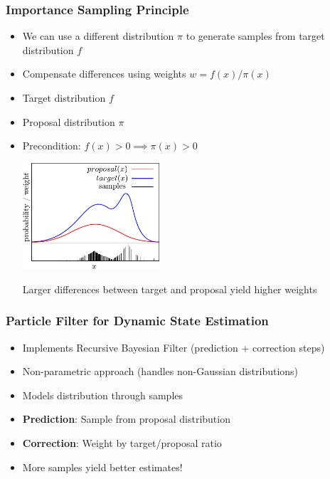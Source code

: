 \begin{frame}
    \frametitle{Importance Sampling Principle}

    \scriptsize

    \begin{itemize}
        \item We can use a different distribution $\pi$ to generate samples from target distribution $f$
        \item Compensate differences using weights $w = f(x) / \pi(x)$
        \item Target distribution $f$
        \item Proposal distribution $\pi$
        \item Precondition: $f(x) > 0 \implies \pi(x) > 0$
        
        \begin{center}
        \includegraphics[width=0.4\textwidth]{./images/particle_filter/importance_sampling_principle.pdf}
        \end{center}
        
        Larger differences between target and proposal yield higher weights
    \end{itemize}
\end{frame}

\begin{frame}
    \frametitle{Particle Filter for Dynamic State Estimation}

    \begin{itemize}
        \item Implements Recursive Bayesian Filter (prediction + correction steps)
        \item Non-parametric approach (handles non-Gaussian distributions)
        \item Models distribution through samples
        \item \textbf{Prediction}: Sample from proposal distribution
        \item \textbf{Correction}: Weight by target/proposal ratio
        \item \alert{More samples yield better estimates!}
    \end{itemize}
\end{frame}

